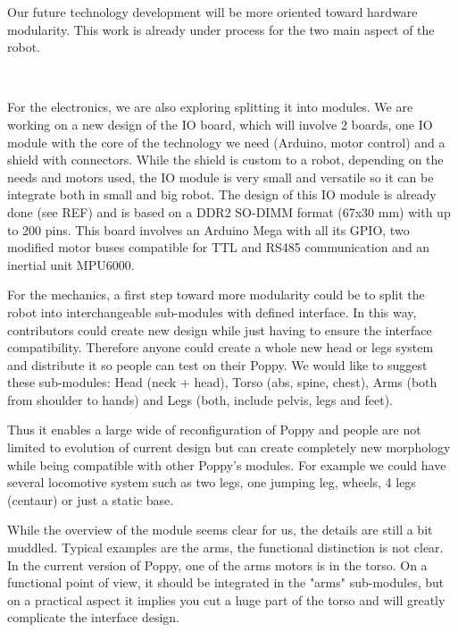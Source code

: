 Our future technology development will be more oriented toward hardware modularity. This work is already under process for the two main aspect of the robot.

\begin{figure}[tb]
\centering
    \hfil
     \\
    \caption{}
    \label{fig:poppy-electronic-modularity}
\end{figure}

For the electronics, we are also exploring splitting it into modules. We are working on a new design of the IO board, which will involve 2 boards, one IO module with the core of the technology we need (Arduino, motor control) and a shield with connectors.
While the shield is custom to a robot, depending on the needs and motors used, the IO module is very small and versatile so it can be integrate both in small and big robot.
The design of this IO module is already done (see REF) and is based on a DDR2 SO-DIMM format (67x30 mm) with up to 200 pins. This board involves an Arduino Mega with all its GPIO, two modified motor buses compatible for TTL and RS485 communication and an inertial unit MPU6000.


For the mechanics, a first step toward more modularity could be to split the robot into interchangeable sub-modules with defined interface. In this way, contributors could create new design while just having to ensure the interface compatibility. Therefore anyone could create a whole new head or legs system and distribute it so people can test on their Poppy.
We would like to suggest these sub-modules: Head (neck + head), Torso (abs, spine, chest), Arms (both from shoulder to hands) and Legs (both, include pelvis, legs and feet).

Thus it enables a large wide of reconfiguration of Poppy and people are not limited to evolution of current design but can create completely new morphology while being compatible with other Poppy's modules.
For example we could have several locomotive system such as two legs, one jumping leg, wheels, 4 legs (centaur) or just a static base.

While the overview of the module seems clear for us, the details are still a bit muddled. Typical examples are the arms, the functional distinction is not clear. In the current version of Poppy, one of the arms motors is in the torso. On a functional point of view, it should be integrated in the "arms" sub-modules, but on a practical aspect it implies you cut a huge part of the torso and will greatly complicate the interface design.

